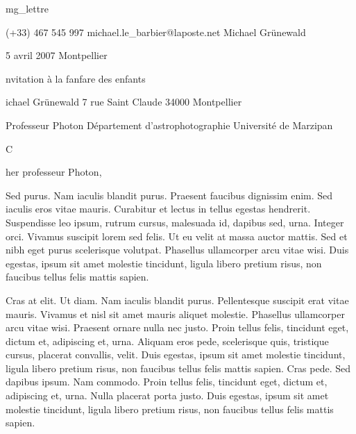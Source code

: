 


\class mg_lettre

%
%



\phone          (+33) 467 545 997
\email          michael.le\_barbier@laposte.net
\name           Michael Grünewald
\date           15 avril 2007
\place          Montpellier
\subject        Invitation à la fanfare des enfants


\address
Michael Grünewald
7 rue Saint Claude
34000 Montpellier

\addressee
Professeur Photon
Département d'astrophotographie
Université de Marzipan

%
%


\opening        Cher professeur Photon,

Sed purus. Nam iaculis blandit purus. Praesent faucibus dignissim
enim. Sed iaculis eros vitae mauris. Curabitur et lectus in tellus
egestas hendrerit. Suspendisse leo ipsum, rutrum cursus, malesuada id,
dapibus sed, urna. Integer orci. Vivamus suscipit lorem sed felis. Ut
eu velit at massa auctor mattis. Sed et nibh eget purus scelerisque
volutpat. Phasellus ullamcorper arcu vitae wisi. Duis egestas, ipsum
sit amet molestie tincidunt, ligula libero pretium risus, non faucibus
tellus felis mattis sapien.

Cras at elit. Ut diam. Nam iaculis blandit purus. Pellentesque
suscipit erat vitae mauris. Vivamus et nisl sit amet mauris aliquet
molestie. Phasellus ullamcorper arcu vitae wisi. Praesent ornare nulla
nec justo. Proin tellus felis, tincidunt eget, dictum et, adipiscing
et, urna. Aliquam eros pede, scelerisque quis, tristique cursus,
placerat convallis, velit. Duis egestas, ipsum sit amet molestie
tincidunt, ligula libero pretium risus, non faucibus tellus felis
mattis sapien. Cras pede. Sed dapibus ipsum. Nam commodo. Proin tellus
felis, tincidunt eget, dictum et, adipiscing et, urna. Nulla placerat
porta justo. Duis egestas, ipsum sit amet molestie tincidunt, ligula
libero pretium risus, non faucibus tellus felis mattis sapien.

